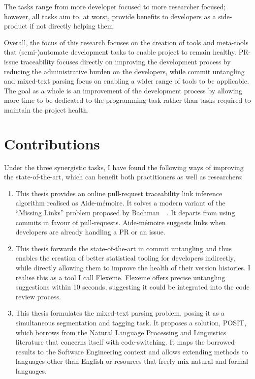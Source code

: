 The tasks range from more developer focused to more researcher focused; however,
all tasks aim to, at worst, provide benefits to developers as a side-product if
not directly helping them.

Overall, the focus of this research focuses on the creation of tools and
meta-tools that (semi-)automate development tasks to enable project to remain
healthy. PR-issue traceability focuses directly on improving the development
process by reducing the administrative burden on the developers, while commit
untangling and mixed-text parsing focus on enabling a wider range of tools to be
applicable. The goal as a whole is an improvement of the development process by
allowing more time to be dedicated to the programming task rather than tasks
required to maintain the project health.

\section{Contributions}
\label{chapter:introduction:sec:contrib}

Under the three synergistic tasks, I have found the following ways of improving
the state-of-the-art, which can benefit both practitioners as well as
researchers:

\begin{enumerate}
    \item This thesis provides an online pull-request traceability link
    inference algorithm realised as Aide-mémoire. It solves a modern variant of
    the ``Missing Links'' problem proposed by Bachman~\etal~\cite{MissingLinks}.
    It departs from using commits in favour of pull-requests. Aide-mémoire
    suggests links when developers are already handling a PR or an issue.
    \item This thesis forwards the state-of-the-art in commit
    untangling and thus enables the creation of better statistical tooling for
    developers indirectly, while directly allowing them to improve the health of
    their version histories. I realise this as a tool I call Flexeme. Flexeme
    offers precise untangling suggestions within 10 seconds, suggesting it could
    be integrated into the code review process.
    \item This thesis formulates the mixed-text parsing problem, posing it as a
    simultaneous segmentation and tagging task. It proposes a solution, POSIT,
    which borrows from the Natural Language Processing and Linguistics
    literature that concerns itself with code-switching. It maps the borrowed
    results to the Software Engineering context and allows extending methods to
    languages other than English or resources that freely mix natural and formal
    languages.
\end{enumerate}

